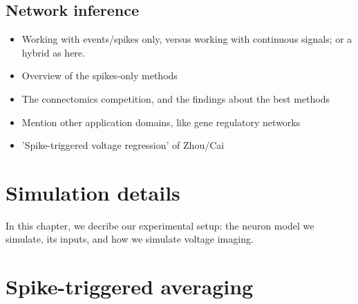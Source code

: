 \documentclass[a4paper, oneside, 11pt]{memoir}
\begin{document}
\section{Network inference}

\begin{itemize}
    \item Working with events/spikes only, versus working with continuous signals; or a hybrid as here.
    \item Overview of the spikes-only methods
    \item The connectomics competition, and the findings about the best methods
    \item Mention other application domains, like gene regulatory networks
    \item 'Spike-triggered voltage regression' of Zhou/Cai
\end{itemize}




\chapter{Simulation details}

In this chapter, we decribe our experimental setup: the neuron model we simulate, its inputs, and how we simulate voltage imaging.





\chapter{Spike-triggered averaging}
\end{document}
